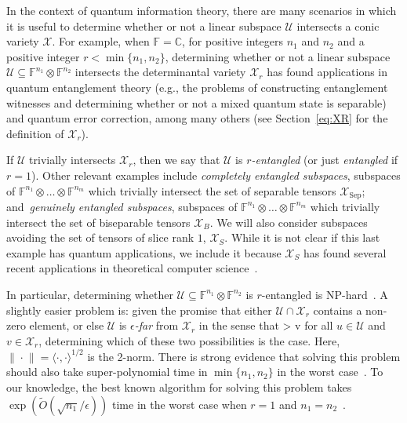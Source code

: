 \documentclass[11pt]{article}
\theoremstyle{definition}
\newcommand{\tinyspace}{\mspace{1mu}}
\newcommand{\ip}[2]{\langle #1 , #2\rangle}
\newcommand{\norm}[1]{\lVert\tinyspace #1 \tinyspace\rVert}
\newcommand{\setft}[1]{\mathrm{#1}}
\newcommand{\complex}{\mathbb{C}}
\newcommand{\field}{\mathbb{F}}
\newcommand\X{\mathcal{X}}
\newcommand\U{\mathcal{U}}
\def\ba#1\ea{\begin{align}#1\end{align}}
\begin{document}
In the context of quantum information theory, there are many scenarios in which it is useful to determine whether or not a linear subspace $\U$ intersects a conic variety $\X$. For example, when ${\field=\complex}$, for positive integers $n_1$ and $n_2$ and a positive integer $r < \min\{n_1,n_2\}$, determining whether or not a linear subspace $\U \subseteq \field^{n_1}\otimes \field^{n_2}$ intersects the determinantal variety $\X_r$ has found applications in quantum entanglement theory (e.g., the problems of constructing entanglement witnesses and determining whether or not a mixed quantum state is separable) and quantum error correction, among many others \cite{Hor97,BDMSST99,ATL11,CS14,HM10} (see Section~\ref{eq:XR} for the definition of $\X_r$).

If $\U$ trivially intersects $\X_r$, then we say that $\U$ is \textit{$r$-entangled} (or just \emph{entangled} if $r = 1$). Other relevant examples include \textit{completely entangled subspaces}, subspaces of $\field^{n_1}\otimes \dots \otimes \field^{n_m}$ which trivially intersect the set of separable tensors $\X_{\setft{Sep}}$; and~\textit{genuinely entangled subspaces}, subspaces of $\field^{n_1}\otimes \dots \otimes \field^{n_m}$ which trivially intersect the set of biseparable tensors $\X_{B}$.
We will also consider subspaces avoiding the set of tensors of slice rank $1$, $\X_{S}$. While it is not clear if this last example has quantum applications, we include it because $\X_S$ has found several recent applications in theoretical computer science~\cite{petrov2016combinatorial,kleinberg2016growth,blasiak2016cap,naslund2017upper,fox2017tight}.

In particular, determining whether $\U\subseteq \field^{n_1}\otimes \field^{n_2}$ is $r$-entangled is NP-hard~\cite{buss1999computational}. A slightly easier problem is: given the promise that either $\U\cap \X_r$ contains a non-zero element, or else $\U$ is $\epsilon$\textit{-far} from $\X_r$ in the sense that
\ba
\norm{v-u}> \epsilon \norm{v}
\ea
for all $u \in \U$ and $v \in \X_r$, determining which of these two possibilities is the case. Here, ${\norm{\cdot}=\ip{\cdot}{\cdot}^{1/2}}$ is the 2-norm. There is strong evidence that solving this problem should also take super-polynomial time in $\min\{n_1,n_2\}$ in the worst case~\cite[Corollary 14]{HM10}. To our knowledge, the best known algorithm for solving this problem takes $\exp(\tilde{O}({\sqrt{n_1}/\epsilon}))$ time in the worst case when $r=1$ and $n_1=n_2$~\cite{barak2017quantum}.
\end{document}
